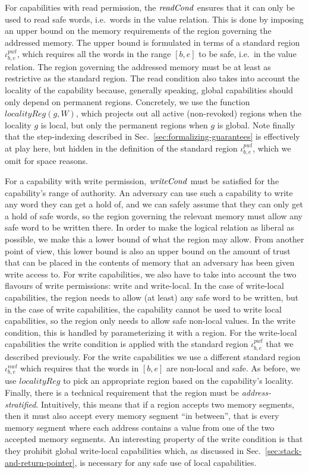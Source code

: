 \documentclass{llncs}
\newcommand{\sectionname}{Sec.}
\newcommand{\var}[1]{\mathit{#1}}
\newcommand{\gl}{\var{g}}
\newcommand{\start}{\var{b}}
\newcommand{\addrend}{\var{e}}
\newcommand{\nwl}{\var{nwl}}
\newcommand{\pwl}{\var{pwl}}
\newcommand{\plainfun}[2]{
  \ifthenelse{\equal{#2}{}}
  {\mathit{#1}}
  {\mathit{#1}(#2)}
}
\newcommand{\readCond}[1]{\plainfun{readCond}{#1}}
\newcommand{\writeCond}[1]{\plainfun{writeCond}{#1}}
\begin{document}
For capabilities with read permission, the $\readCond{}$ ensures that it can
only be used to read safe words, i.e.\ words in the value relation.
This is done by imposing an upper bound on the memory requirements of the region
governing the addressed memory. The upper bound is formulated in terms of a
standard region $\iota^\pwl_{\start,\addrend}$, which requires all the words in
the range $[\start,\addrend]$ to be safe, i.e.\ in the value relation. The
region governing the addressed memory must be at least as restrictive as the
standard region. The read condition also takes into account the locality of the
capability because, generally speaking, global capabilities should only depend
on permanent regions. Concretely, we use the function
$\var{localityReg}(\gl,W)$, which projects out all active (non-revoked) regions
when the locality $\gl$ is local, but only the permanent regions when $\gl$ is
global. Note finally that the step-indexing described in
\sectionname~\ref{sec:formalizing-guarantees} is effectively at play here, but hidden
in the definition of the standard region $\iota^\pwl_{\start,\addrend}$, which
we omit for space reasons.

For a capability with write permission, $\writeCond{}$ must be satisfied for the
capability's range of authority. An adversary can use such a capability to write
any word they can get a hold of, and we can safely assume that they can only get
a hold of safe words, so the region governing the relevant memory must allow any
safe word to be written there. In order to make the logical relation as liberal
as possible, we make this a lower bound of what the region may allow. From
another point of view, this lower bound is also an upper bound on the amount of
trust that can be placed in the contents of memory that an adversary has been
given write access to. For write capabilities, we also have to take into account
the two flavours of write permissions: write and write-local. In the case of
write-local capabilities, the region needs to allow (at least) any safe word to
be written, but in the case of write capabilities, the capability cannot be used
to write local capabilities, so the region only needs to allow safe non-local
values. In the write condition, this is handled by parameterizing it with a
region. For the write-local capabilities the write condition is applied with the
standard region $\iota^\pwl_{\start,\addrend}$ that we described previously. For
the write capabilities we use a different standard region
$\iota^\nwl_{\start,\addrend}$ which requires that the words in
$[\start,\addrend]$ are non-local and safe. As before, we use
$\var{localityReg}$ to pick an appropriate region based on the capability's
locality. Finally, there is a technical requirement that the region must be
\emph{address-stratified}. Intuitively, this means that if a region accepts two
memory segments, then it must also accept every memory segment ``in between'',
that is every memory segment where each address contains a value from one of the
two accepted memory segments. An interesting property of the write condition is
that they prohibit global write-local capabilities which, as discussed in
\sectionname~\ref{sec:stack-and-return-pointer}, is necessary for any safe use of
local capabilities.
\end{document}
